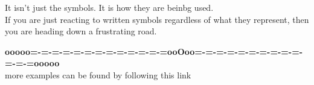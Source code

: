 \documentclass{ximera}
\begin{document}
It isn't just the symbols.  It is how they are beinbg used. \\


If you are just reacting to written symbols regardless of what they represent, then you are heading down a frustrating road.





\begin{center}
\textbf{\textcolor{green!50!black}{ooooo=-=-=-=-=-=-=-=-=-=-=-=-=ooOoo=-=-=-=-=-=-=-=-=-=-=-=-=ooooo}} \\

more examples can be found by following this link\\ 

\end{center}
\end{document}
